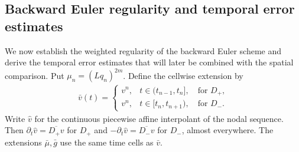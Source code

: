 \documentclass[print,wide,eng]{draft}
\begin{document}
\subsection{Backward Euler regularity and temporal error estimates}

We now establish the weighted regularity of the backward Euler scheme and derive the temporal error estimates that will later be combined with the spatial comparison. Put $\mu_n=(Lq_n)^{2m}$.
Define the cellwise extension by\vspace{-2mm}
%
\begin{align}\label{eq:cellwise-extension}
\bar v(t)=\begin{cases}
v^n, & t\in(t_{n-1},t_n],\quad\text{for }D_+,\\
v^n, & t\in[t_n,t_{n+1}),\quad\text{for }D_-.
\end{cases}
\end{align}
%
Write $\widehat v$ for the continuous piecewise affine interpolant of the nodal sequence.
Then $\partial_t\widehat v=\overline{D_+v}$ for $D_+$ and $-\partial_t\widehat v=\overline{D_-v}$ for $D_-$, almost everywhere.
The extensions $\bar\mu,\bar g$ use the same time cells as $\bar v$.
\end{document}
